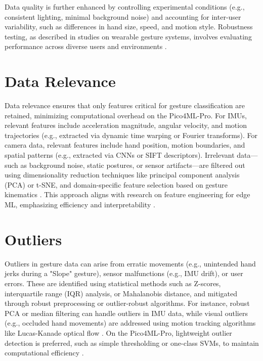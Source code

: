 Data quality is further enhanced by controlling experimental conditions (e.g., consistent lighting, minimal background noise) and accounting for inter-user variability, such as differences in hand size, speed, and motion style. Robustness testing, as described in studies on wearable gesture systems, involves evaluating performance across diverse users and environments \cite{Perumandla:2021, Gupta:2022}.



\section{Data Relevance}

Data relevance ensures that only features critical for gesture classification are retained, minimizing computational overhead on the Pico4ML-Pro. For IMUs, relevant features include acceleration magnitude, angular velocity, and motion trajectories (e.g., extracted via dynamic time warping or Fourier transforms). For camera data, relevant features include hand position, motion boundaries, and spatial patterns (e.g., extracted via CNNs or SIFT descriptors). Irrelevant data—such as background noise, static postures, or sensor artifacts—are filtered out using dimensionality reduction techniques like principal component analysis (PCA) or t-SNE, and domain-specific feature selection based on gesture kinematics \cite{Wang:2019, Park:2014}. This approach aligns with research on feature engineering for edge ML, emphasizing efficiency and interpretability \cite{Coogan:2006}.



\section{Outliers}

Outliers in gesture data can arise from erratic movements (e.g., unintended hand jerks during a "Slope" gesture), sensor malfunctions (e.g., IMU drift), or user errors. These are identified using statistical methods such as Z-scores, interquartile range (IQR) analysis, or Mahalanobis distance, and mitigated through robust preprocessing or outlier-robust algorithms. For instance, robust PCA or median filtering can handle outliers in IMU data, while visual outliers (e.g., occluded hand movements) are addressed using motion tracking algorithms like Lucas-Kanade optical flow \cite{Park:2014, Li:2020}. On the Pico4ML-Pro, lightweight outlier detection is preferred, such as simple thresholding or one-class SVMs, to maintain computational efficiency \cite{Garcia:2019,Bishop:1995}.



